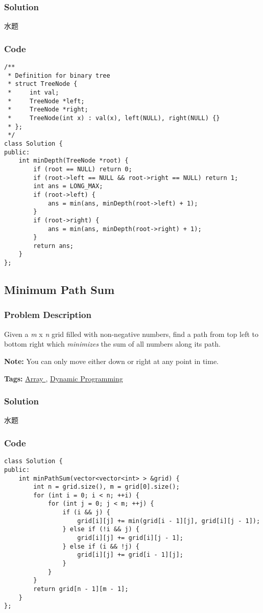 \documentclass{article}
\begin{document}
\begin{CJK*}{UTF8}{gkai}
\subsubsection*{Solution}
水题

\subsubsection*{Code}
\begin{lstlisting}
/**
 * Definition for binary tree
 * struct TreeNode {
 *     int val;
 *     TreeNode *left;
 *     TreeNode *right;
 *     TreeNode(int x) : val(x), left(NULL), right(NULL) {}
 * };
 */
class Solution {
public:
    int minDepth(TreeNode *root) {
        if (root == NULL) return 0;
        if (root->left == NULL && root->right == NULL) return 1;
        int ans = LONG_MAX;
        if (root->left) {
            ans = min(ans, minDepth(root->left) + 1);
        }
        if (root->right) {
            ans = min(ans, minDepth(root->right) + 1);
        }
        return ans;
    }
}; 
\end{lstlisting}


\subsection{ Minimum Path Sum }
\label{ Minimum Path Sum }

\subsubsection*{Problem Description}
Given a \emph{m} x \emph{n} grid filled with non-negative numbers, find a path from top left to bottom right which \emph{minimizes} the sum of all numbers along its path.

\textbf{Note:} You can only move either down or right at any point in time.


\textbf{Tags: }
\hyperref[ Array ]{ Array },  \hyperref[ Dynamic Programming ]{ Dynamic Programming }



\subsubsection*{Solution}
水题

\subsubsection*{Code}
\begin{lstlisting}
class Solution {
public:
    int minPathSum(vector<vector<int> > &grid) {
        int n = grid.size(), m = grid[0].size();
        for (int i = 0; i < n; ++i) {
            for (int j = 0; j < m; ++j) {
                if (i && j) {
                    grid[i][j] += min(grid[i - 1][j], grid[i][j - 1]);
                } else if (!i && j) {
                    grid[i][j] += grid[i][j - 1];
                } else if (i && !j) {
                    grid[i][j] += grid[i - 1][j];
                }
            }
        }
        return grid[n - 1][m - 1];
    }
}; 
\end{lstlisting}



\end{CJK*}
\end{document}
